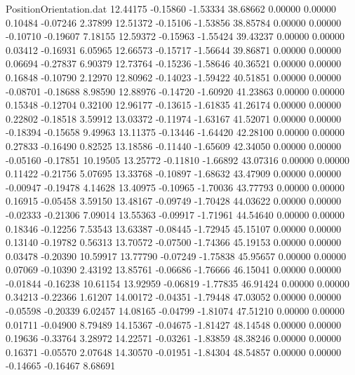 \begin{filecontents}{PositionOrientation.dat}
  12.44175   -0.15860   -1.53334    38.68662    0.00000    0.00000    0.10484   -0.07246    2.37899
  12.51372   -0.15106   -1.53856    38.85784    0.00000    0.00000   -0.10710   -0.19607    7.18155
  12.59372   -0.15963   -1.55424    39.43237    0.00000    0.00000    0.03412   -0.16931    6.05965
  12.66573   -0.15717   -1.56644    39.86871    0.00000    0.00000    0.06694   -0.27837    6.90379
  12.73764   -0.15236   -1.58646    40.36521    0.00000    0.00000    0.16848   -0.10790    2.12970
  12.80962   -0.14023   -1.59422    40.51851    0.00000    0.00000   -0.08701   -0.18688    8.98590
  12.88976   -0.14720   -1.60920    41.23863    0.00000    0.00000    0.15348   -0.12704    0.32100
  12.96177   -0.13615   -1.61835    41.26174    0.00000    0.00000    0.22802   -0.18518    3.59912
  13.03372   -0.11974   -1.63167    41.52071    0.00000    0.00000   -0.18394   -0.15658    9.49963
  13.11375   -0.13446   -1.64420    42.28100    0.00000    0.00000    0.27833   -0.16490    0.82525
  13.18586   -0.11440   -1.65609    42.34050    0.00000    0.00000   -0.05160   -0.17851   10.19505
  13.25772   -0.11810   -1.66892    43.07316    0.00000    0.00000    0.11422   -0.21756    5.07695
  13.33768   -0.10897   -1.68632    43.47909    0.00000    0.00000   -0.00947   -0.19478    4.14628
  13.40975   -0.10965   -1.70036    43.77793    0.00000    0.00000    0.16915   -0.05458    3.59150
  13.48167   -0.09749   -1.70428    44.03622    0.00000    0.00000   -0.02333   -0.21306    7.09014
  13.55363   -0.09917   -1.71961    44.54640    0.00000    0.00000    0.18346   -0.12256    7.53543
  13.63387   -0.08445   -1.72945    45.15107    0.00000    0.00000    0.13140   -0.19782    0.56313
  13.70572   -0.07500   -1.74366    45.19153    0.00000    0.00000    0.03478   -0.20390   10.59917
  13.77790   -0.07249   -1.75838    45.95657    0.00000    0.00000    0.07069   -0.10390    2.43192
  13.85761   -0.06686   -1.76666    46.15041    0.00000    0.00000   -0.01844   -0.16238   10.61154
  13.92959   -0.06819   -1.77835    46.91424    0.00000    0.00000    0.34213   -0.22366    1.61207
  14.00172   -0.04351   -1.79448    47.03052    0.00000    0.00000   -0.05598   -0.20339    6.02457
  14.08165   -0.04799   -1.81074    47.51210    0.00000    0.00000    0.01711   -0.04900    8.79489
  14.15367   -0.04675   -1.81427    48.14548    0.00000    0.00000    0.19636   -0.33764    3.28972
  14.22571   -0.03261   -1.83859    48.38246    0.00000    0.00000    0.16371   -0.05570    2.07648
  14.30570   -0.01951   -1.84304    48.54857    0.00000    0.00000   -0.14665   -0.16467    8.68691

\end{filecontents}
